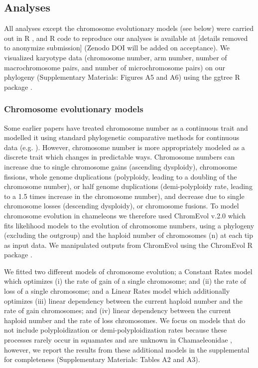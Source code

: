 \documentclass[a4paper, 12pt]{article}
\begin{document}
\subsection{Analyses}
All analyses except the chromosome evolutionary models (see below) were carried out in R \citep{R}, and R code to reproduce our analyses is available at [details removed to anonymize submission] (Zenodo DOI will be added on acceptance). 
We visualized karyotype data (chromosome number, arm number, number of macrochromosome pairs, and number of microchromosome pairs) on our phylogeny (Supplementary Materials: Figures A5 and A6) using the ggtree R package \citep{yu2017ggtree}.

\subsubsection{Chromosome evolutionary models}
Some earlier papers have treated chromosome number as a continuous trait and modelled it using standard phylogenetic comparative methods for continuous data (e.g. \citealt{vershinina2017evolutionary}). 
However, chromosome number is more appropriately modeled as a discrete trait which changes in predictable ways. 
Chromosome numbers can increase due to single chromosome gains (ascending dysploidy), chromosome fissions, whole genome duplications (polyploidy, leading to a doubling of the chromosome number), or half genome duplications (demi-polyploidy rate, leading to a 1.5 times increase in the chromosome number), and decrease due to single chromosome losses (descending dysploidy), or chromosome fusions. 
To model chromosome evolution in chameleons we therefore used ChromEvol v.2.0 \citep{glick2014chromevol,mayrose2010probabilistic} which fits likelihood models to the evolution of chromosome numbers, using a phylogeny (excluding the outgroup) and the haploid number of chromosomes (n) at each tip as input data. 
We manipulated outputs from ChromEvol using the ChromEvol R package \citep{chromevol}.

We fitted two different models of chromosome evolution; a Constant Rates model which optimizes (i) the rate of gain of a single chromosome; and (ii) the rate of loss of a single chromosome; and a Linear Rates model which additionally optimizes (iii) linear dependency between the current haploid number and the rate of gain chromosomes; and (iv) linear dependency between the current haploid number and the rate of loss chromosomes. 
We focus on models that do not include polyploidization or demi-polyploidization rates because these processes rarely occur in squamates and are unknown in Chamaeleonidae \citep{bogart1980evolutionary,mezzasalma2021lizards}, however, we report the results from these additional models in the supplemental for completeness (Supplementary Materials: Tables A2 and A3). 
\end{document}

